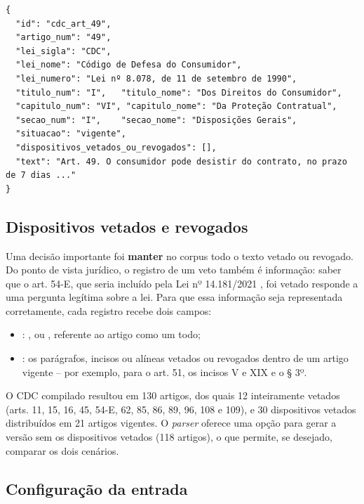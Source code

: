 \begin{lstlisting}[caption={Registro de um artigo no arquivo \code{cdc.json} (campos nulos omitidos; texto abreviado).}, label=lst-registro-json]
{
  "id": "cdc_art_49",
  "artigo_num": "49",
  "lei_sigla": "CDC",
  "lei_nome": "Código de Defesa do Consumidor",
  "lei_numero": "Lei nº 8.078, de 11 de setembro de 1990",
  "titulo_num": "I",   "titulo_nome": "Dos Direitos do Consumidor",
  "capitulo_num": "VI", "capitulo_nome": "Da Proteção Contratual",
  "secao_num": "I",    "secao_nome": "Disposições Gerais",
  "situacao": "vigente",
  "dispositivos_vetados_ou_revogados": [],
  "text": "Art. 49. O consumidor pode desistir do contrato, no prazo de 7 dias ..."
}
\end{lstlisting}




\subsection{Dispositivos vetados e revogados}
\label{sec-indexacao-corpus-vetados}

Uma decisão importante foi \textbf{manter} no corpus todo o texto vetado ou revogado. Do ponto de vista jurídico, o registro de um veto também é informação: saber que o art. 54-E, que seria incluído pela Lei nº 14.181/2021 \cite{brasil2021lei14181}, foi vetado responde a uma pergunta legítima sobre a lei. Para que essa informação seja representada corretamente, cada registro recebe dois campos:

\begin{itemize}
    \item {}: ,  ou , referente ao artigo como um todo;
    \item {}: os parágrafos, incisos ou alíneas vetados ou revogados dentro de um artigo vigente -- por exemplo, para o art. 51, os incisos V e XIX e o § 3º.
\end{itemize}

O CDC compilado resultou em 130 artigos, dos quais 12 inteiramente vetados (arts. 11, 15, 16, 45, 54-E, 62, 85, 86, 89, 96, 108 e 109), e 30 dispositivos vetados distribuídos em 21 artigos vigentes. O \textit{parser} oferece uma opção para gerar a versão sem os dispositivos vetados (118 artigos), o que permite, se desejado, comparar os dois cenários.

\subsection{Configuração da entrada}
\label{sec-indexacao-corpus-entrada}

